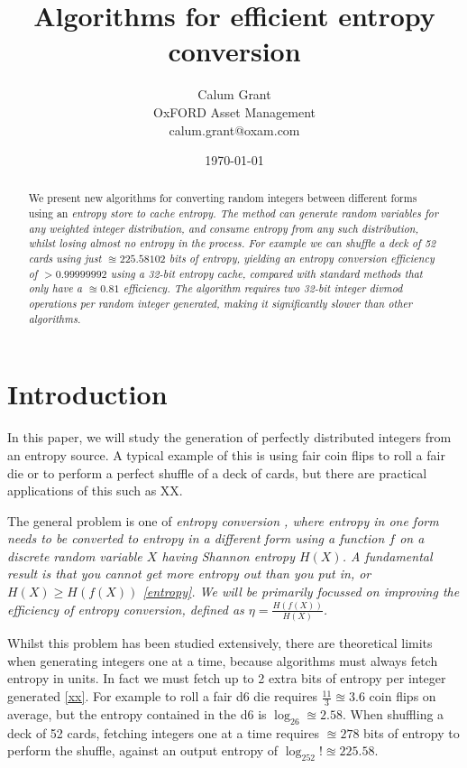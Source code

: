 \documentclass[12pt]{article}
\title{Algorithms for efficient entropy conversion}
\author{Calum Grant \\
OxFORD Asset Management \\
calum.grant@oxam.com}
\date{\today}
\begin{document}
\maketitle

\begin{abstract}
    We present new algorithms for converting random integers between different forms using an \em entropy store \em to cache entropy. The method can generate random variables for any weighted integer distribution, and consume entropy from any such distribution, whilst losing almost no entropy in the process.  For example we can shuffle a deck of 52 cards using just $\approxeq 225.58102$ bits of entropy, yielding an entropy conversion efficiency of $>0.99999992$ using a 32-bit entropy cache, compared with standard methods that only have a $\approxeq 0.81$ efficiency.  The algorithm requires two 32-bit integer divmod operations per random integer generated, making it significantly slower than other algorithms.
\end{abstract}

\section{Introduction}

In this paper, we will study the generation of perfectly distributed integers from an entropy source. A typical example of this is using fair coin flips to roll a fair die or to perform a perfect shuffle of a deck of cards, but there are practical applications of this such as XX.

The general problem is one of \em entropy conversion \em, where entropy in one form needs to be converted to entropy in a different form using a function $f$ on a discrete random variable $X$ having Shannon entropy $H(X)$.  A fundamental result is that you cannot get more entropy out than you put in, or $H(X) \ge H(f(X))$ \ref{entropy}. We will be primarily focussed on improving the efficiency of entropy conversion, defined as $\eta = \frac{H(f(X))}{H(X)}$.

Whilst this problem has been studied extensively, there are theoretical limits when generating integers one at a time, because algorithms must always fetch entropy in units. In fact we must fetch up to 2 extra bits of entropy per integer generated \ref{xx}.  For example to roll a fair d6 die requires $\frac{11}{3} \approxeq 3.6$ coin flips on average, but the entropy contained in the d6 is $\log_26 \approxeq 2.58$. When shuffling a deck of 52 cards, fetching integers one at a time requires $\approxeq 278$ bits of entropy to perform the shuffle, against an output entropy of $\log_252! \approxeq 225.58$.
\end{document}
